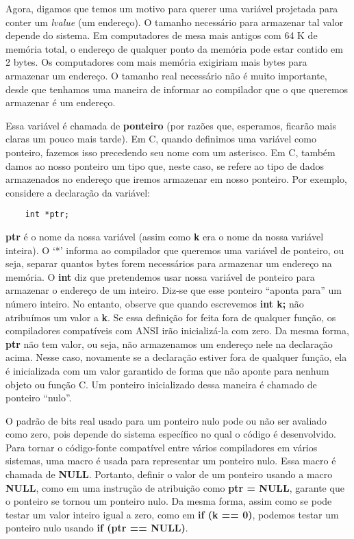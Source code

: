 Agora, digamos que temos um motivo para querer uma variável projetada para conter um \textit{lvalue} (um endereço). O tamanho necessário para armazenar tal valor depende do sistema. Em computadores de mesa mais antigos com 64 K de memória total, o endereço de qualquer ponto da memória pode estar contido em 2 bytes. Os computadores com mais memória exigiriam mais bytes para armazenar um endereço. O tamanho real necessário não é muito importante, desde que tenhamos uma maneira de informar ao compilador que o que queremos armazenar é um endereço.

Essa variável é chamada de \textbf{ponteiro} (por razões que, esperamos, ficarão mais claras um pouco mais tarde). Em C, quando definimos uma variável como ponteiro, fazemos isso precedendo seu nome com um asterisco. Em C, também damos ao nosso ponteiro um tipo que, neste caso, se refere ao tipo de dados armazenados no endereço que iremos armazenar em nosso ponteiro. Por exemplo, considere a declaração da variável:

\begin{lstlisting}
	int *ptr;
\end{lstlisting}

\textbf{ptr} é o nome da nossa variável (assim como \textbf{k} era o nome da nossa variável inteira). O `*' informa ao compilador que queremos uma variável de ponteiro, ou seja, separar quantos bytes forem necessários para armazenar um endereço na memória. O \textbf{int} diz que pretendemos usar nossa variável de ponteiro para armazenar o endereço de um inteiro. Diz-se que esse ponteiro ``aponta para'' um número inteiro. No entanto, observe que quando escrevemos \textbf{int k;} não atribuímos um valor a \textbf{k}. Se essa definição for feita fora de qualquer função, os compiladores compatíveis com ANSI irão inicializá-la com zero. Da mesma forma, \textbf{ptr} não tem valor, ou seja, não armazenamos um endereço nele na declaração acima. Nesse caso, novamente se a declaração estiver fora de qualquer função, ela é inicializada com um valor garantido de forma que não aponte para nenhum objeto ou função C. Um ponteiro inicializado dessa maneira é chamado de ponteiro ``nulo''.

O padrão de bits real usado para um ponteiro nulo pode ou não ser avaliado como zero, pois depende do sistema específico no qual o código é desenvolvido. Para tornar o código-fonte compatível entre vários compiladores em vários sistemas, uma macro é usada para representar um ponteiro nulo. Essa macro é chamada de \textbf{NULL}. Portanto, definir o valor de um ponteiro usando a macro \textbf{NULL}, como em uma instrução de atribuição como \textbf{ptr = NULL}, garante que o ponteiro se tornou um ponteiro nulo. Da mesma forma, assim como se pode testar um valor inteiro igual a zero, como em \textbf{if (k == 0)}, podemos testar um ponteiro nulo usando \textbf{if (ptr == NULL)}.


